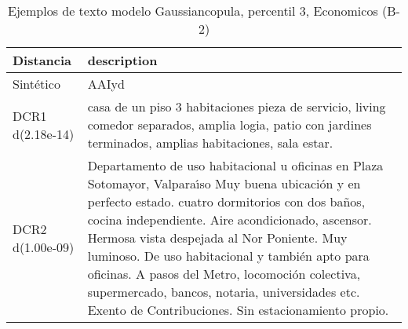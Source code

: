 \begin{table}[H]
\centering
\fontsize{10}{14}\selectfont
\caption{Ejemplos de texto modelo Gaussiancopula, percentil 3, Economicos (B-2)}
\label{table-example-economicos-b-2-gaussiancopula-3p-text}
\begin{tabular}{|l|m{35em}|}
\hline
\rowcolor[gray]{0.8}
Distancia & description \\
\hline Sintético & AAIyd \\
\hline DCR1 d(2.18e-14) & casa de un piso 3 habitaciones pieza de servicio, living comedor separados, amplia logia, patio con jardines terminados, amplias habitaciones, sala estar. \\
\hline DCR2 d(1.00e-09) & Departamento de uso habitacional u oficinas en Plaza Sotomayor, Valpara{\'\i}so
Muy buena ubicaci\'on y en perfecto estado.
cuatro dormitorios con dos ba\~nos, cocina independiente.
Aire acondicionado, ascensor.
Hermosa vista despejada al Nor  Poniente. Muy luminoso. 
De uso habitacional y tambi\'en apto para oficinas. A pasos del Metro, locomoci\'on colectiva, supermercado, bancos, notaria, universidades etc.
Exento de Contribuciones.
Sin estacionamiento propio.
 \\
\hline
\end{tabular}
\end{table}
